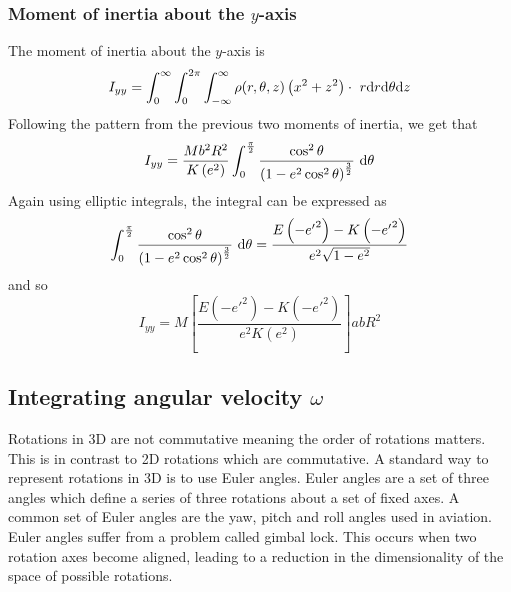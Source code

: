 \subsubsection{Moment of inertia about the \texorpdfstring{\( y \)}{y}-axis}
The moment of inertia about the \( y \)-axis is
\begin{equation}
    I_{yy} = \int_{0}^{\infty} \int_{0}^{2\pi} \int_{-\infty}^{\infty} \rho(r, \theta, z) \left(x^2 + z^2\right) \cdot \,{}\,{} r \textrm{d}{r}\textrm{d}{\theta}\textrm{d}{z}
\end{equation}
Following the pattern from the previous two moments of inertia, we get that
\begin{equation}
    I_{yy} = \frac{Mb^2R^2}{K\left(e^2\right)}  \int_{0}^{\frac{\pi}{2}} \frac{\cos^2{\theta}}{{\left({1 - e^2\cos^2{\theta}}\right)}^{\frac{3}{2}}}  \,{}\,{} \textrm{d}{\theta}
\end{equation}
Again using elliptic integrals, the integral can be expressed as
\begin{equation}
    \int_{0}^{\frac{\pi}{2}} \frac{\cos^2{\theta}}{{\left({1 - e^2\cos^2{\theta}}\right)}^{\frac{3}{2}}}  \,{}\,{} \textrm{d}{\theta}
    = \frac{E\left(-{e'}^{2}\right) - K\left(-{e'}^{2}\right)}{e^2\sqrt{1 - e^2}}
\end{equation}
and so
\begin{equation}
    I_{yy} = M
    \left[
        \frac{E\left(-{e'}^{2}\right) - K\left(-{e'}^{2}\right)}{e^2K\left(e^2\right)}
        \right]
    ab R^2
\end{equation}

\subsection{Integrating angular velocity \texorpdfstring{\( \omega \)}{w}}\label{sec:quaternions}
Rotations in 3D are not commutative meaning the order of rotations matters. This is in contrast to 2D rotations which are
commutative. A standard way to represent rotations in 3D is to use Euler angles. Euler angles are a set of three angles which
define a series of three rotations about a set of fixed axes. A common set of Euler angles are the yaw, pitch and roll angles used
in aviation. Euler angles suffer from a problem called gimbal lock. This occurs when two rotation axes become aligned, leading
to a reduction in the dimensionality of the space of possible rotations.

